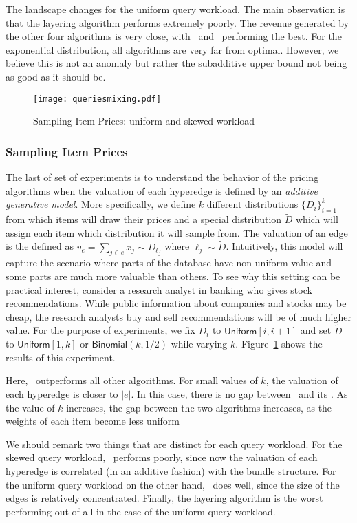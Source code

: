 The landscape changes for the uniform query workload. The main observation is that the layering
algorithm performs extremely poorly. The revenue generated by the other four algorithms is very
close, with \lpip\ and \ubp\ performing the best.  
For the exponential distribution, all algorithms are very far from optimal. However, we believe this is not an anomaly but rather the subadditive upper bound not being as good as it should be.


\begin{figure}[!t]
	\centering
	\texttt{[image: queriesmixing.pdf]}
	\caption{Sampling Item Prices: uniform and skewed workload} \label{fig:mixing}
\end{figure}  

\subsubsection{Sampling Item Prices} The last of set of experiments is to understand the behavior of the pricing algorithms when the valuation of each hyperedge is defined by an \emph{additive generative model}. More specifically, we define $k$ different distributions $\{D_i\}_{i=1}^{k}$ from which items will draw their prices and a special distribution $\tilde{D}$ which will assign each item which distribution it will sample from. The valuation of an edge is the defined as $v_e = \sum_{j \in e} x_j \sim D_{\ell_j}$ where $\ell_j \sim \tilde{D}$. Intuitively, this model will capture the scenario where parts of the database have non-uniform value and some parts are much more valuable than others. To see why this setting can be practical interest, consider a research analyst in banking who gives stock recommendations. While public information about companies and stocks may be cheap, the research analysts buy and sell recommendations will be of much higher value. For the purpose of experiments, we fix $D_i$ to $\textsf{Uniform}[i, i+1]$ and set $\tilde{D}$ to $\textsf{Uniform}[1, k]$ or $\textsf{Binomial}(k, 1/2)$ while varying $k$. Figure~\ref{fig:mixing} shows the results of this experiment. 

Here, \lpip\ outperforms all other algorithms. For small values of $k$, the valuation of each hyperedge is closer to $|e|$. In this case, there is no gap between \uip\ and its \lpip. As the value of $k$ increases, the gap between the two algorithms increases, as the weights of each item become less uniform
 
We should remark two things that are distinct for each query workload. For the skewed query workload, \ubp\ performs poorly, since now the valuation of each hyperedge is correlated (in an additive fashion) with the bundle structure. For the uniform query workload on the other hand, \ubp\ does well, since   
the size of the edges is relatively concentrated. Finally, the layering algorithm is the worst performing out of all in the case of the uniform query workload.

